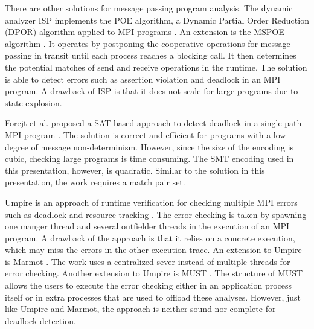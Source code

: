 There are other solutions for message passing program analysis.
The dynamic analyzer ISP implements the POE algorithm, a Dynamic Partial Order Reduction (DPOR) algorithm \cite{DBLP:conf/popl/FlanaganG05} applied to MPI programs \cite{DBLP:conf/ppopp/VakkalankaSGK08}. 
An extension is the MSPOE algorithm \cite{DBLP:conf/sbmf/SharmaGB12}. It operates by postponing the cooperative operations for message passing in transit until each process reaches a blocking call. It then determines the potential matches of send and receive operations in the runtime. The solution is able to detect errors such as assertion violation and deadlock in an MPI program.
A drawback of ISP is that it does not scale for large programs due to state explosion.

Forejt et al. proposed a SAT based approach to detect deadlock in a single-path MPI program \cite{DBLP:conf/fm/ForejtKNS14}. The solution is correct and efficient for programs with a low degree of message non-determinism. However, since the size of the encoding is cubic, checking large programs is time consuming. The SMT encoding used in this presentation, however, is quadratic. Similar to the solution in this presentation, the work requires a match pair set.

Umpire is an approach of runtime verification for checking multiple MPI errors such as deadlock and resource tracking \cite{DBLP:conf/sc/VetterS00}. The error checking is taken by spawning one manger thread and several outfielder threads in the execution of an MPI program. A drawback of the approach is that it relies on a concrete execution, which may miss the errors in the other execution trace.
An extension to Umpire is Marmot \cite{DBLP:conf/parco/KrammerBMR03}. The work uses a centralized sever instead of multiple threads for error checking. Another extension to Umpire is MUST \cite{DBLP:conf/ptw/HilbrichSSM09}. The structure of MUST allows the users to execute the error checking either in an application process itself or in extra processes that are used to offload these analyses. %
However, just like Umpire and Marmot, the approach is neither sound nor complete for deadlock detection. 


